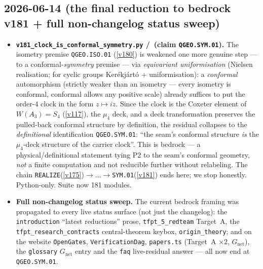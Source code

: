 \subsection*{2026-06-14 (the final reduction to bedrock v181 + full non-changelog status sweep)}
\begin{itemize}
\item \textbf{\texttt{v181\_clock\_is\_conformal\_symmetry.py} \mE/\mO\ (claim \texttt{QGEO.SYM.01}).}
  The isometry premise \texttt{QGEO.ISO.01} (\vref{v180}) is weakened one more genuine step --- to a
  conformal-\emph{symmetry} premise --- via \emph{equivariant uniformisation} (Nielsen realisation; for
  cyclic groups Ker\'ekj\'art\'o $+$ uniformisation): a \emph{conformal} automorphism (strictly weaker
  than an isometry --- every isometry is conformal, conformal allows any positive scale) already suffices
  to put the order-$4$ clock in the form $z\mapsto iz$. Since the clock is the Coxeter element of
  $W(A_3)=S_4$ (\vref{v117}), the $\mu_4$ deck, and a deck transformation preserves the pulled-back
  conformal structure by definition, the residual collapses to the \emph{definitional} identification
  \texttt{QGEO.SYM.01}: ``the seam's conformal structure \emph{is} the $\mu_4$-deck structure of the
  carrier clock''. This is bedrock --- a physical/definitional statement tying P2 to the seam's conformal
  geometry, \emph{not} a finite computation and not reducible further without relabeling. The chain
  \texttt{REALIZE}(\vref{v175})$\to\dots\to$\texttt{SYM.01}(\vref{v181}) ends here; we stop honestly.
  Python-only. Suite now 181 modules.
\item \textbf{Full non-changelog status sweep.} The current bedrock framing was propagated to every
  live status surface (not just the changelog): the \texttt{introduction} ``latest reductions'' prose,
  \texttt{tfpt\_5\_redteam} Target~A, the \texttt{tfpt\_research\_contracts} central-theorem keybox,
  \texttt{origin\_theory}; and on the website \texttt{OpenGates}, \texttt{VerificationDag},
  \texttt{papers.ts} (Target~A $\times2$, $G_{\mathrm{net}}$), the \texttt{glossary} $G_{\mathrm{net}}$
  entry and the \texttt{faq} live-residual answer --- all now end at \texttt{QGEO.SYM.01}.
\end{itemize}

